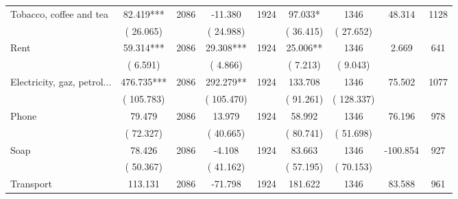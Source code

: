 \begin{tabular}{l*{8}{c}}
Tobacco, coffee and tea        &             82.419***      &       2086       &            -11.380      &       1924       &             97.033*      &       1346  &       48.314 &       1128       \\
                       &       (      26.065)            &                               &       (      24.988)            &                               &       (      36.415)            &       (      27.652) &                  \\
Rent        &             59.314***      &       2086       &             29.308***      &       1924       &             25.006**      &       1346  &        2.669 &       641       \\
                       &       (       6.591)            &                               &       (       4.866)            &                               &       (       7.213)            &       (       9.043) &                  \\
Electricity, gaz, petrol...        &            476.735***      &       2086       &            292.279**      &       1924       &            133.708      &       1346  &       75.502 &       1077       \\
                       &       (     105.783)            &                               &       (     105.470)            &                               &       (      91.261)            &       (     128.337) &                  \\
Phone        &             79.479      &       2086       &             13.979      &       1924       &             58.992      &       1346  &       76.196 &       978       \\
                       &       (      72.327)            &                               &       (      40.665)            &                               &       (      80.741)            &       (      51.698) &                  \\
Soap        &             78.426      &       2086       &             -4.108      &       1924       &             83.663      &       1346  &     -100.854 &       927       \\
                       &       (      50.367)            &                               &       (      41.162)            &                               &       (      57.195)            &       (      70.153) &                  \\
Transport        &            113.131      &       2086       &            -71.798      &       1924       &            181.622      &       1346  &       83.588 &       961       \\

\end{tabular}
